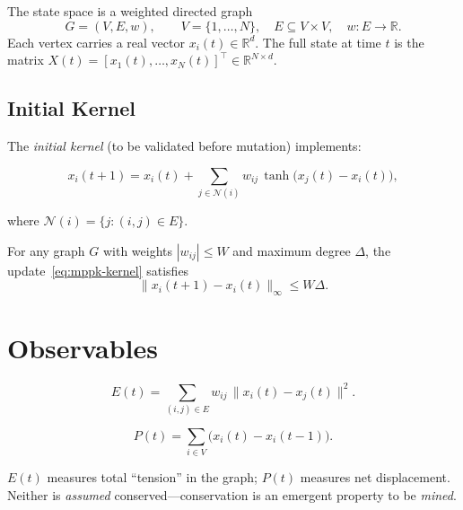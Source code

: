 The state space is a weighted directed graph
\[
  G = (V, E, w), \qquad
  V = \{1,\dots,N\},\quad
  E \subseteq V\times V,\quad
  w\colon E\to\mathbb{R}.
\]
Each vertex carries a real vector $x_i(t)\in\mathbb{R}^d$.
The full state at time $t$ is the matrix
$X(t) = [x_1(t),\dots,x_N(t)]^\top \in \mathbb{R}^{N\times d}$.

\subsection{Initial Kernel}

The \emph{initial kernel} (to be validated before mutation) implements:

\begin{equation}\label{eq:mppk-kernel}
  x_i(t{+}1) = x_i(t)
  + \sum_{j\in\mathcal{N}(i)} w_{ij}\,
    \tanh\!\bigl(x_j(t) - x_i(t)\bigr),
\end{equation}

where $\mathcal{N}(i) = \{j : (i,j)\in E\}$.

\begin{proposition}\label{prop:tanh-bounded}
For any graph $G$ with weights $|w_{ij}|\le W$ and maximum degree
$\Delta$, the update~\eqref{eq:mppk-kernel} satisfies
\[
  \|x_i(t{+}1) - x_i(t)\|_\infty \le W\Delta.
\]
\end{proposition}

\section{Observables}
\label{sec:mppk-observables}

\begin{definition}\label{def:mppk-energy}
\begin{equation}
  E(t) = \sum_{(i,j)\in E} w_{ij}\,\|x_i(t) - x_j(t)\|^2.
\end{equation}
\end{definition}

\begin{definition}\label{def:mppk-momentum}
\begin{equation}
  P(t) = \sum_{i\in V} \bigl(x_i(t) - x_i(t{-}1)\bigr).
\end{equation}
\end{definition}

\noindent
$E(t)$ measures total ``tension'' in the graph; $P(t)$ measures
net displacement.  Neither is \emph{assumed} conserved---conservation
is an emergent property to be \emph{mined}.

